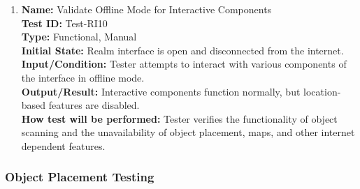 \documentclass[12pt, titlepage]{article}
\begin{document}
\begin{enumerate}
\item \textbf{Name:} Validate Offline Mode for Interactive Components \label{itm:Test-RI10} \\
\textbf{Test ID:} Test-RI10 \\
\textbf{Type:} Functional, Manual \\
\textbf{Initial State:} Realm interface is open and disconnected from the internet. \\
\textbf{Input/Condition:} Tester attempts to interact with various components of the interface in offline mode. \\
\textbf{Output/Result:} Interactive components function normally, but location-based features are disabled. \\
\textbf{How test will be performed:} Tester verifies the functionality of object scanning and the unavailability of object placement, maps, and other internet dependent features.

\end{enumerate}

\subsubsection{Object Placement Testing}
\end{document}
